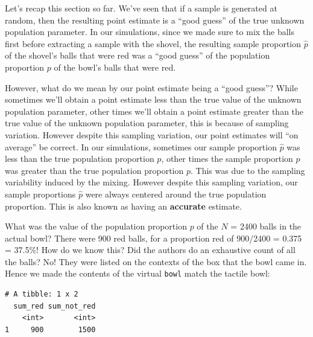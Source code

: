 \documentclass[12pt, krantz2,]{krantz}
\makeatletter
\newenvironment{Shaded}{\begin{snugshade}}{\end{snugshade}}
\newcommand{\DataTypeTok}[1]{\textcolor[rgb]{0.27,0.27,0.27}{#1}}
\newcommand{\KeywordTok}[1]{\textcolor[rgb]{0.27,0.27,0.27}{\textbf{#1}}}
\newcommand{\NormalTok}[1]{#1}
\newcommand{\OperatorTok}[1]{\textcolor[rgb]{0.43,0.43,0.43}{\textbf{#1}}}
\newcommand{\StringTok}[1]{\textcolor[rgb]{0.5,0.5,0.5}{#1}}
\newenvironment{kframe}{%
\medskip{}
\setlength{\fboxsep}{.8em}
 \def\at@end@of@kframe{}%
 \ifinner\ifhmode%
  \def\at@end@of@kframe{\end{minipage}}%
  \begin{minipage}{\columnwidth}%
 \fi\fi%
 \def\FrameCommand##1{\hskip\@totalleftmargin \hskip-\fboxsep
 \colorbox{shadecolor}{##1}\hskip-\fboxsep
     \hskip-\linewidth \hskip-\@totalleftmargin \hskip\columnwidth}%
 \MakeFramed {\advance\hsize-\width
   \@totalleftmargin\z@ \linewidth\hsize
   \@setminipage}}%
 {\par\unskip\endMakeFramed%
 \at@end@of@kframe}
\renewenvironment{Shaded}{\begin{kframe}}{\end{kframe}}
\makeatother
\begin{document}
Let's recap this section so far. We've seen that if a sample is generated at random, then the resulting point estimate is a ``good guess'' of the true unknown population parameter. In our simulations, since we made sure to mix the balls first before extracting a sample with the shovel, the resulting sample proportion \(\widehat{p}\) of the shovel's balls that were red was a ``good guess'' of the population proportion \(p\) of the bowl's balls that were red.

However, what do we mean by our point estimate being a ``good guess''? While sometimes we'll obtain a point estimate less than the true value of the unknown population parameter, other times we'll obtain a point estimate greater than the true value of the unknown population parameter, this is because of sampling variation. However despite this sampling variation, our point estimates will ``on average'' be correct. In our simulations, sometimes our sample proportion \(\widehat{p}\) was less than the true population proportion \(p\), other times the sample proportion \(\widehat{p}\) was greater than the true population proportion \(p\). This was due to the sampling variability induced by the mixing. However despite this sampling variation, our sample proportions \(\widehat{p}\) were always centered around the true population proportion. This is also known as having an \textbf{accurate} estimate.

What was the value of the population proportion \(p\) of the \(N\) = 2400 balls in the actual bowl? There were 900 red balls, for a proportion red of 900/2400 = 0.375 = 37.5\%! How do we know this? Did the authors do an exhaustive count of all the balls? No! They were listed on the contexts of the box that the bowl came in. Hence we made the contents of the virtual \texttt{bowl} match the tactile bowl:

\begin{Shaded}
\end{Shaded}

\begin{verbatim}
# A tibble: 1 x 2
  sum_red sum_not_red
    <int>       <int>
1     900        1500
\end{verbatim}
\end{document}
